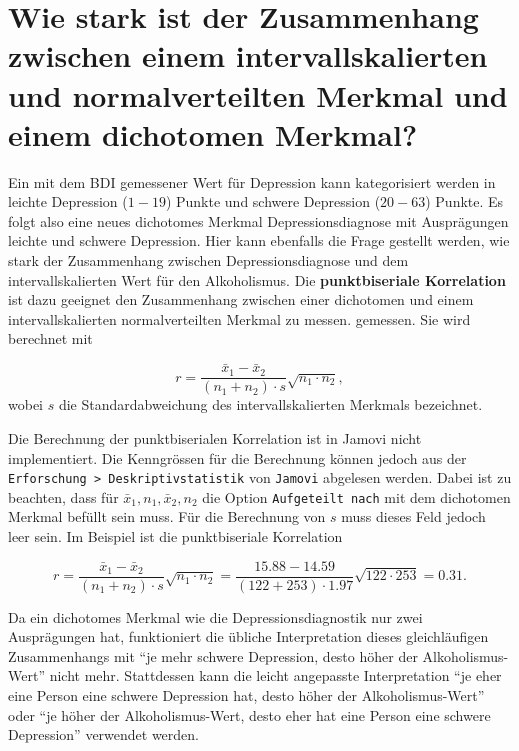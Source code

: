 \documentclass[
]{book}
\theoremstyle{definition}
\theoremstyle{definition}
\theoremstyle{definition}
\theoremstyle{definition}
\theoremstyle{remark}
\begin{document}
\section{Wie stark ist der Zusammenhang zwischen einem intervallskalierten und normalverteilten Merkmal und einem dichotomen Merkmal?}\label{wie-stark-ist-der-zusammenhang-zwischen-einem-intervallskalierten-und-normalverteilten-merkmal-und-einem-dichotomen-merkmal}

Ein mit dem BDI gemessener Wert für Depression kann kategorisiert werden in leichte Depression (\(1-19\)) Punkte und schwere Depression (\(20-63\)) Punkte. Es folgt also eine neues dichotomes Merkmal Depressionsdiagnose mit Ausprägungen leichte und schwere Depression. Hier kann ebenfalls die Frage gestellt werden, wie stark der Zusammenhang zwischen Depressionsdiagnose und dem intervallskalierten Wert für den Alkoholismus. \label{customdef-punktbiseriale-korrelation}{Die \textbf{punktbiseriale Korrelation} ist dazu geeignet den Zusammenhang zwischen einer dichotomen und einem intervallskalierten normalverteilten Merkmal zu messen.} gemessen. Sie wird berechnet mit

\[ r = \frac{\bar{x}_1- \bar{x}_2}{(n_1+n_2)\cdot s}\sqrt{n_1\cdot n_2},\]
wobei \(s\) die Standardabweichung des intervallskalierten Merkmals bezeichnet.

Die Berechnung der punktbiserialen Korrelation ist in Jamovi nicht implementiert. Die Kenngrössen für die Berechnung können jedoch aus der \texttt{Erforschung\ \textgreater{}\ Deskriptivstatistik} von \texttt{Jamovi} abgelesen werden. Dabei ist zu beachten, dass für \(\bar{x}_1, n_1, \bar{x}_2, n_2\) die Option \texttt{Aufgeteilt\ nach} mit dem dichotomen Merkmal befüllt sein muss. Für die Berechnung von \(s\) muss dieses Feld jedoch leer sein. Im Beispiel ist die punktbiseriale Korrelation

\[ r = \frac{\bar{x}_1- \bar{x}_2}{(n_1+n_2)\cdot s}\sqrt{n_1\cdot n_2}
= \frac{15.88- 14.59}{(122+253)\cdot 1.97}\sqrt{122\cdot 253} = 0.31.\]

Da ein dichotomes Merkmal wie die Depressionsdiagnostik nur zwei Ausprägungen hat, funktioniert die übliche Interpretation dieses gleichläufigen Zusammenhangs mit ``je mehr schwere Depression, desto höher der Alkoholismus-Wert'' nicht mehr. Stattdessen kann die leicht angepasste Interpretation ``je eher eine Person eine schwere Depression hat, desto höher der Alkoholismus-Wert'' oder ``je höher der Alkoholismus-Wert, desto eher hat eine Person eine schwere Depression'' verwendet werden.
\end{document}
